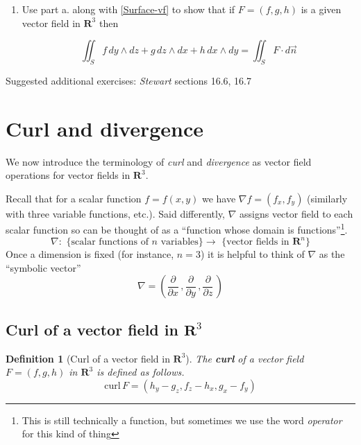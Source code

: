 \documentclass[12pt]{article}
\numberwithin{equation}{subsection}
\numberwithin{figure}{subsection}
\newtheorem{defn}[subsection]{Definition}
\theoremstyle{note}
\newcommand{\curl}{\mathrm{curl\,}}
\begin{document}
{\begin{enumerate}[label=\arabic*.]
\begin{enumerate}
	\item Use part a. along with \eqref{Surface-vf} to show that if $F=(f,g,h)$ is a given vector field in $\mathbf{R}^3$ then 
	
	\[ \iint_{S} f \, dy\wedge dz + g\, dz\wedge dx+h \, dx\wedge dy =\iint_{S} F\cdot d\vec{n} \] 
\end{enumerate}
\end{enumerate}

Suggested additional exercises: \textit{Stewart} sections 16.6, 16.7


\section{Curl and divergence}

We now introduce the terminology of \textit{curl} and \textit{divergence} as vector field operations for vector fields in $\mathbf{R}^3$. 


Recall that for a scalar function $f=f(x,y)$ we have $\nabla f=(f_x,f_y)$ (similarly with three variable functions, etc.). Said differently, $\nabla$ assigns vector field to each scalar function so can be thought of as a ``function whose domain is functions''\footnote{This is still technically a function, but sometimes we use the word \textit{operator} for this kind of thing}. \[ \nabla \colon \text{ \{scalar functions of $n$ variables\} } \to \text{ \{vector fields in $\mathbf{R}^n$\} } \]
Once a dimension is fixed (for instance, $n=3$) it is helpful to think of  $\nabla$ as the ``symbolic vector'' \begin{equation}\label{grad} \nabla = \left( \dfrac{\partial}{\partial x} \, , \dfrac{\partial}{\partial y}\, , \dfrac{\partial}{\partial z}\, \right) \end{equation} 

\subsection{Curl of a vector field in $\mathbf{R}^3$}
\begin{defn}[Curl of a vector field in $\mathbf{R}^3$] The \textbf{curl} of a vector field $F=(f,g,h)$ in $\mathbf{R}^3$ is defined as follows. 
\begin{equation} \label{curl} \curl F = ( h_y-g_z, f_z-h_x, g_x-f_y)\end{equation}
\end{defn}

}
\end{document}
